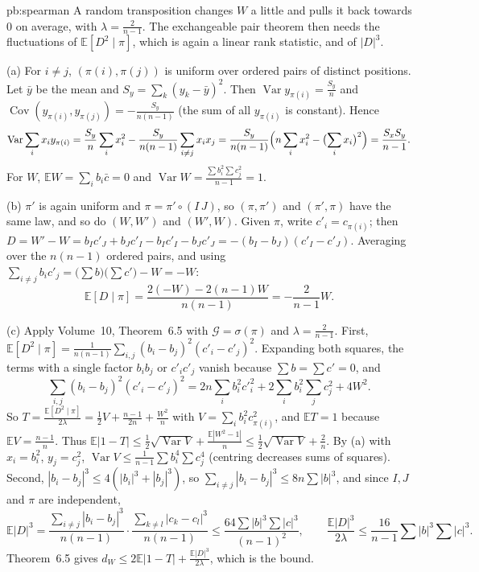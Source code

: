 \begin{solution}{pb:spearman}
\idea A random transposition changes $W$ a little and pulls it back towards $0$ on average, with $\lambda=\frac2{n-1}$. The exchangeable pair theorem then needs the
fluctuations of $\mathbb E[D^2\mid\pi]$, which is again a linear rank statistic, and of $|D|^3$.

\writeup (a) For $i\ne j$, $(\pi(i),\pi(j))$ is uniform over ordered pairs of distinct positions. Let $\bar y$ be the mean and $S_y=\sum_k(y_k-\bar y)^2$. Then
$\operatorname{Var}y_{\pi(i)}=\frac{S_y}n$ and $\operatorname{Cov}(y_{\pi(i)},y_{\pi(j)})=-\frac{S_y}{n(n-1)}$ (the sum of all $y_{\pi(i)}$ is constant). Hence
\[
\operatorname{Var}\sum_ix_iy_{\pi(i)}=\frac{S_y}n\sum_ix_i^2-\frac{S_y}{n(n-1)}\sum_{i\ne j}x_ix_j=\frac{S_y}{n(n-1)}\Bigl(n\sum_ix_i^2-\bigl(\sum_ix_i\bigr)^2\Bigr)=\frac{S_xS_y}{n-1}.
\]
For $W$, $\mathbb EW=\sum_ib_i\bar c=0$ and $\operatorname{Var}W=\frac{\sum b_i^2\sum c_j^2}{n-1}=1$.

(b) $\pi'$ is again uniform and $\pi=\pi'\circ(I\,J)$, so $(\pi,\pi')$ and $(\pi',\pi)$ have the same law, and so do $(W,W')$ and $(W',W)$. Given $\pi$, write $c'_i=c_{\pi(i)}$;
then $D=W'-W=b_Ic'_J+b_Jc'_I-b_Ic'_I-b_Jc'_J=-(b_I-b_J)(c'_I-c'_J)$. Averaging over the $n(n-1)$ ordered pairs, and using $\sum_{i\ne j}b_ic'_j=\bigl(\sum b\bigr)\bigl(\sum c'\bigr)-W=-W$:
\[
\mathbb E[D\mid\pi]=\frac{2(-W)-2(n-1)W}{n(n-1)}=-\frac2{n-1}W.
\]

(c) Apply Volume~10, Theorem~6.5 with $\mathcal G=\sigma(\pi)$ and $\lambda=\frac2{n-1}$. First,
$\mathbb E[D^2\mid\pi]=\frac1{n(n-1)}\sum_{i,j}(b_i-b_j)^2(c'_i-c'_j)^2$. Expanding both squares, the terms with a single factor $b_ib_j$ or $c'_ic'_j$ vanish because $\sum b=\sum c'=0$, and
\[
\sum_{i,j}(b_i-b_j)^2(c'_i-c'_j)^2=2n\sum_ib_i^2c'^2_i+2\sum_ib_i^2\sum_jc_j^2+4W^2.
\]
So $T=\frac{\mathbb E[D^2\mid\pi]}{2\lambda}=\frac12V+\frac{n-1}{2n}+\frac{W^2}n$ with $V=\sum_ib_i^2c_{\pi(i)}^2$, and $\mathbb ET=1$ because $\mathbb EV=\frac{n-1}n$. Thus
$\mathbb E|1-T|\le\frac12\sqrt{\operatorname{Var}V}+\frac{\mathbb E|W^2-1|}n\le\frac12\sqrt{\operatorname{Var}V}+\frac2n$. By (a) with $x_i=b_i^2$, $y_j=c_j^2$,
$\operatorname{Var}V\le\frac1{n-1}\sum b_i^4\sum c_j^4$ (centring decreases sums of squares). Second, $|b_i-b_j|^3\le4(|b_i|^3+|b_j|^3)$, so
$\sum_{i\ne j}|b_i-b_j|^3\le8n\sum|b|^3$, and since $I,J$ and $\pi$ are independent,
\[
\mathbb E|D|^3=\frac{\sum_{i\ne j}|b_i-b_j|^3}{n(n-1)}\cdot\frac{\sum_{k\ne l}|c_k-c_l|^3}{n(n-1)}\le\frac{64\sum|b|^3\sum|c|^3}{(n-1)^2},
\qquad\frac{\mathbb E|D|^3}{2\lambda}\le\frac{16}{n-1}\sum|b|^3\sum|c|^3.
\]
Theorem~6.5 gives $d_W\le2\mathbb E|1-T|+\frac{\mathbb E|D|^3}{2\lambda}$, which is the bound.


\end{solution}
